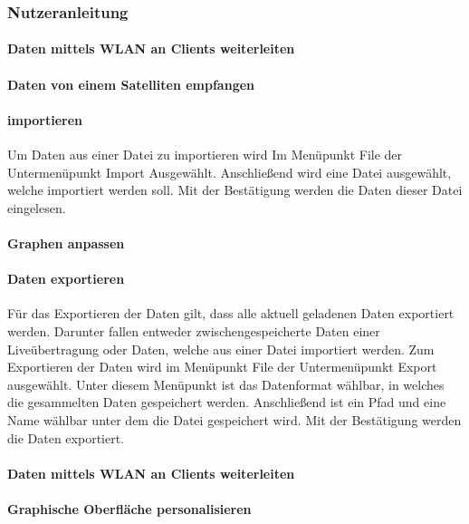\subsubsection{Nutzeranleitung}
\paragraph{Daten mittels WLAN an Clients weiterleiten}
\paragraph{Daten von einem Satelliten empfangen}
\paragraph{importieren}
Um Daten aus einer Datei zu importieren wird Im Menüpunkt File der Untermenüpunkt Import Ausgewählt. Anschließend wird eine Datei ausgewählt, welche importiert werden soll. Mit der Bestätigung werden die Daten dieser Datei eingelesen.
\paragraph{Graphen anpassen}
\paragraph{Daten exportieren}
Für das Exportieren der Daten gilt, dass alle aktuell geladenen Daten exportiert werden. Darunter fallen entweder zwischengespeicherte Daten einer Liveübertragung oder Daten, welche aus einer Datei importiert werden.
Zum Exportieren der Daten wird im Menüpunkt File der Untermenüpunkt Export ausgewählt. Unter diesem Menüpunkt ist das Datenformat wählbar, in welches die gesammelten Daten gespeichert werden. Anschließend ist ein Pfad und eine Name wählbar unter dem die Datei gespeichert wird. Mit der Bestätigung werden die Daten exportiert.
\paragraph{Daten mittels WLAN an Clients weiterleiten}
\paragraph{Graphische Oberfläche personalisieren}
